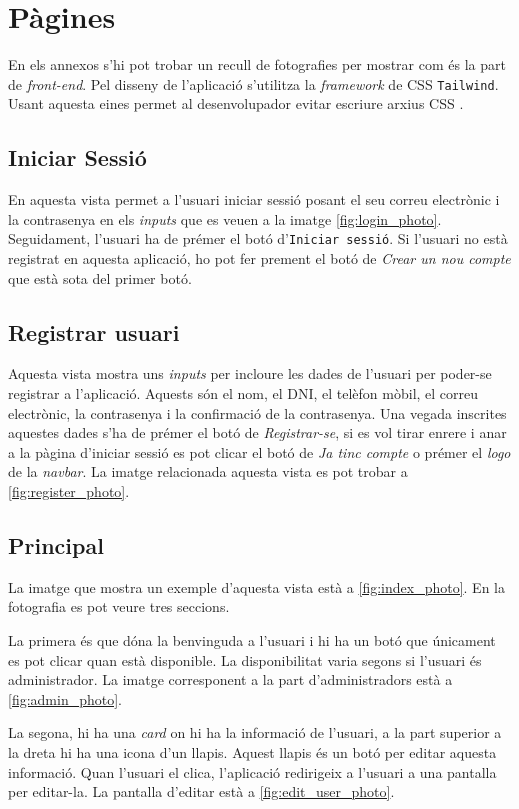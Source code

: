 \section{Pàgines}
En els annexos s'hi pot trobar un recull de fotografies per mostrar com és la part de \emph{front-end}.
Pel disseny de l'aplicació s'utilitza la \emph{framework} de CSS \texttt{Tailwind}. Usant
aquesta eines permet al desenvolupador evitar escriure arxius CSS \autocite{tailwind}.

\subsection{Iniciar Sessió}
En aquesta vista permet a l'usuari iniciar sessió posant el seu correu electrònic i la contrasenya
en els \emph{inputs} que es veuen a la imatge \autoref{fig:login_photo}. Seguidament, l'usuari ha de prémer el botó d'\texttt{Iniciar sessió}. Si l'usuari no està registrat en aquesta aplicació, ho pot fer prement el botó de \emph{Crear un nou compte} que està sota del primer botó.

\subsection{Registrar usuari}
Aquesta vista mostra uns \emph{inputs} per incloure les dades de l'usuari per
poder-se registrar a l'aplicació. Aquests són el nom, el DNI, el telèfon mòbil, el correu electrònic, la contrasenya
i la confirmació de la contrasenya. Una vegada inscrites aquestes dades s'ha de prémer el botó de \emph{Registrar-se},
si es vol tirar enrere i anar a la pàgina d'iniciar sessió es pot clicar el botó de \emph{Ja tinc compte} o prémer el \emph{logo} de
la \emph{navbar}. La imatge relacionada aquesta vista es pot trobar a \autoref{fig:register_photo}.

\subsection{Principal}
La imatge que mostra un exemple d'aquesta vista està a \autoref{fig:index_photo}. En la fotografia es pot veure tres seccions.

La primera és que dóna la benvinguda a l'usuari i hi ha un botó que únicament es pot clicar quan està disponible.
La disponibilitat varia segons si l'usuari és administrador. La imatge corresponent a la part d'administradors
està a \autoref{fig:admin_photo}.

La segona, hi ha una \emph{card} on hi ha la informació de l'usuari, a la part superior a la dreta
hi ha una icona d'un llapis. Aquest llapis és un botó per editar aquesta informació. Quan l'usuari
el clica, l'aplicació redirigeix a l'usuari a una pantalla per editar-la. La pantalla d'editar està a
\autoref{fig:edit_user_photo}.

